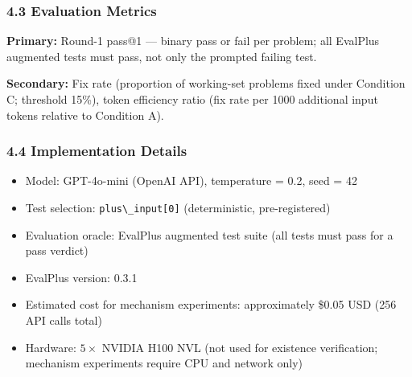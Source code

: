 \subsubsection{4.3 Evaluation Metrics}

\textbf{Primary:} Round-1 pass@1 --- binary pass or fail per problem; all EvalPlus augmented tests must pass, not only the prompted failing test.

\textbf{Secondary:} Fix rate (proportion of working-set problems fixed under Condition C; threshold 15\%), token efficiency ratio (fix rate per 1000 additional input tokens relative to Condition A).

\subsubsection{4.4 Implementation Details}

\begin{itemize}
\item Model: GPT-4o-mini (OpenAI API), temperature = 0.2, seed = 42
\item Test selection: \texttt{plus\textbackslash \_input[0]} (deterministic, pre-registered)
\item Evaluation oracle: EvalPlus augmented test suite (all tests must pass for a pass verdict)
\item EvalPlus version: 0.3.1
\item Estimated cost for mechanism experiments: approximately \$0.05 USD (256 API calls total)
\item Hardware: $5\times$ NVIDIA H100 NVL (not used for existence verification; mechanism experiments require CPU and network only)
\end{itemize}

